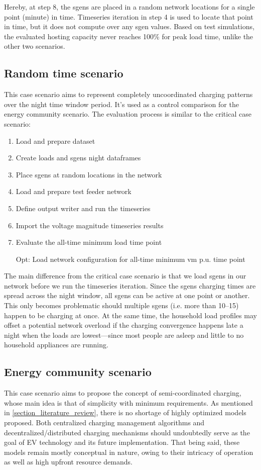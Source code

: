 \documentclass[a4paper,10pt]{report}
\begin{document}
Hereby, at step 8, the sgens are placed in a random network locations for a single point (minute) in time. Timeseries iteration in step 4 is used to locate that point in time, but it does not compute over any sgen values. Based on test simulations, the evaluated hosting capacity never reaches 100\% for peak load time, unlike the other two scenarios.

\subsection{Random time scenario}
This case scenario aims to represent completely uncoordinated charging patterns over the night time window period. It's used as a control comparison for the energy community scenario. The evaluation process is similar to the critical case scenario:
\begin{enumerate}
	\item Load and prepare dataset
	\item Create loads and sgens night dataframes
	\item Place sgens at random locations in the network
	\item Load and prepare test feeder network
	\item Define output writer and run the timeseries
	\item Import the voltage magnitude timeseries results
	\item Evaluate the all-time minimum load time point
	\item[Opt:] Load network configuration for all-time minimum vm p.u. time point
\end{enumerate}

The main difference from the critical case scenario is that we load sgens in our network before we run the timeseries iteration. Since the sgens charging times are spread across the night window, all sgens can be active at one point or another. This only becomes problematic should multiple sgens (i.e. more than 10--15) happen to be charging at once. At the same time, the household load profiles may offset a potential network overload if the charging convergence happens late a night when the loads are lowest---since most people are asleep and little to no household appliances are running.


\subsection{Energy community scenario}
This case scenario aims to propose the concept of semi-coordinated charging, whose main idea is that of simplicity with minimum requirements. As mentioned in  \cref{section_literature_review}, there is no shortage of highly optimized models proposed. Both centralized charging management algorithms and decentralized/distributed charging mechanisms should undoubtedly serve as the goal of EV technology and its future implementation. That being said, these models remain mostly conceptual in nature, owing to their intricacy of operation as well as high upfront resource demands.
\end{document}
